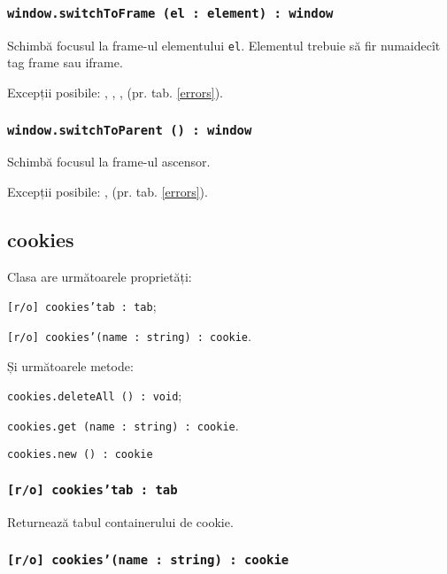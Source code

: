 \subsubsection{\texttt{window.switchToFrame (el : element) : window}}

Schimbă focusul la frame-ul elementului \texttt{el}. Elementul trebuie să fir numaidecît tag frame sau iframe.

Excepții posibile: , , ,  (pr. tab. \ref{errors}).

\subsubsection{\texttt{window.switchToParent () : window}}

Schimbă focusul la frame-ul ascensor.

Excepții posibile: ,  (pr. tab. \ref{errors}).

\subsection{cookies}

Clasa \cookies{} are următoarele proprietăți:
\begin{icItems}
	\item \texttt{[r/o] cookies'tab : tab};
	\item \texttt{[r/o] cookies'(name : string) : cookie}.
\end{icItems}

Și următoarele metode: 
\begin{icItems}
	\item \texttt{cookies.deleteAll () : void};
	\item \texttt{cookies.get (name : string) : cookie}.
	\item \texttt{cookies.new () : cookie}
\end{icItems}

\subsubsection{\texttt{[r/o] cookies'tab : tab}}

Returnează tabul containerului de cookie.

\subsubsection{\texttt{[r/o] cookies'(name : string) : cookie}}

